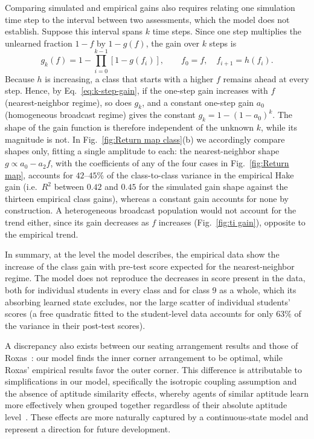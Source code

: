 \documentclass[a4paper,fleqn]{cas-sc}
\begin{document}
    Comparing simulated and empirical gains also requires relating one simulation time step to the interval between two assessments, which the model does not establish.
    Suppose this interval spans $k$ time steps.
    Since one step multiplies the unlearned fraction $1-f$ by $1-g(f)$, the gain over $k$ steps is
    \begin{equation}
        g_k(f) = 1-\prod_{i=0}^{k-1}\left[1-g(f_i)\right], \qquad f_0=f,\quad f_{i+1}=h(f_i).
    \label{eq:k-step-gain}
    \end{equation}
    Because $h$ is increasing, a class that starts with a higher $f$ remains ahead at every step.
    Hence, by Eq.~\eqref{eq:k-step-gain}, if the one-step gain increases with $f$ (nearest-neighbor regime), so does $g_k$, and a constant one-step gain $a_0$ (homogeneous broadcast regime) gives the constant $g_k=1-(1-a_0)^k$.
    The shape of the gain function is therefore independent of the unknown $k$, while its magnitude is not.
    In Fig.~\ref{fig:Return map class}(b) we accordingly compare shapes only, fitting a single amplitude to each: the nearest-neighbor shape $g\propto a_0-a_2f$, with the coefficients of any of the four cases in Fig.~\ref{fig:Return map}, accounts for $42$--$45\%$ of the class-to-class variance in the empirical Hake gain (i.e.\ $R^2$ between $0.42$ and $0.45$ for the simulated gain shape against the thirteen empirical class gains), whereas a constant gain accounts for none by construction.
    A heterogeneous broadcast population would not account for the trend either, since its gain decreases as $f$ increases (Fig.~\ref{fig:ti gain}), opposite to the empirical trend.

    In summary, at the level the model describes, the empirical data show the increase of the class gain with pre-test score expected for the nearest-neighbor regime.
    The model does not reproduce the decreases in score present in the data, both for individual students in every class and for class 9 as a whole, which its absorbing learned state excludes, nor the large scatter of individual students' scores (a free quadratic fitted to the student-level data accounts for only $63\%$ of the variance in their post-test scores).

    A discrepancy also exists between our seating arrangement results and those of Roxas~\citep{roxas2010seating}: our model finds the inner corner arrangement to be optimal, while Roxas' empirical results favor the outer corner.
    This difference is attributable to simplifications in our model, specifically the isotropic coupling assumption and the absence of aptitude similarity effects, whereby agents of similar aptitude learn more effectively when grouped together regardless of their absolute aptitude level~\citep{smith2009peer}.
    These effects are more naturally captured by a continuous-state model and represent a direction for future development.
\end{document}
